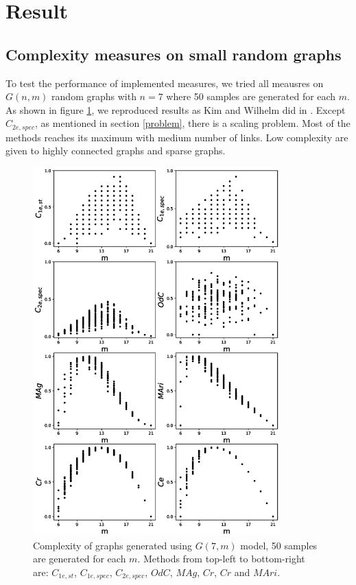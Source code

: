 \documentclass[12pt]{article}
\begin{document}
\section{Result}
\subsection{Complexity measures on small random graphs}
To test the performance of implemented measures, we tried all meausres on $G(n,m)$ random graphs with $n=7$ where 50 samples are generated for each $m$. As shown in figure \ref{fig:small_graphs}, we reproduced results as Kim and Wilhelm did in \cite{KIM20082637}. Except $C_{2e,spec}$, as mentioned in section \ref{problem}, there is a scaling problem. Most of the methods reaches its maximum with medium number of links. Low complexity are given to highly connected graphs and sparse graphs.
\clearpage
\newpage
\begin{figure}[p!]
    \includegraphics[width=0.85\textwidth]{complexities.eps}
    \vspace*{-0.8in}
    \centering
    \caption{Complexity of graphs generated using $G(7,m)$ model, 50 samples are generated for each $m$. Methods from top-left to bottom-right are: $C_{1e,st}$, $C_{1e,spec}$, $C_{2e,spec}$, $OdC$, $MAg$, $Cr$, $Cr$ and $MAri$.}
    \label{fig:small_graphs}
    \clearpage
\end{figure}
\end{document}
